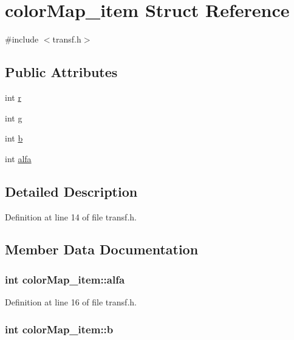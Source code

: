 \hypertarget{structcolorMap__item}{
\section{colorMap\_\-item Struct Reference}
\label{structcolorMap__item}
}


{\ttfamily \#include $<$transf.h$>$}

\subsection*{Public Attributes}
\begin{DoxyCompactItemize}
\item 
int \hyperlink{structcolorMap__item_a3311c0394d61bb9b970152d46e323a32}{r}
\item 
int \hyperlink{structcolorMap__item_aced65d1d505d181eb5e553afd5713155}{g}
\item 
int \hyperlink{structcolorMap__item_a00afd487beb2d02973ab14245f82bd9b}{b}
\item 
int \hyperlink{structcolorMap__item_ad487f4e8f4084352134028ad15c666df}{alfa}
\end{DoxyCompactItemize}


\subsection{Detailed Description}


Definition at line 14 of file transf.h.



\subsection{Member Data Documentation}
\hypertarget{structcolorMap__item_ad487f4e8f4084352134028ad15c666df}{
\subsubsection[{alfa}]{\setlength{\rightskip}{0pt plus 5cm}int {\bf colorMap\_\-item::alfa}}}
\label{structcolorMap__item_ad487f4e8f4084352134028ad15c666df}


Definition at line 16 of file transf.h.

\hypertarget{structcolorMap__item_a00afd487beb2d02973ab14245f82bd9b}{
\subsubsection[{b}]{\setlength{\rightskip}{0pt plus 5cm}int {\bf colorMap\_\-item::b}}}
\label{structcolorMap__item_a00afd487beb2d02973ab14245f82bd9b}


